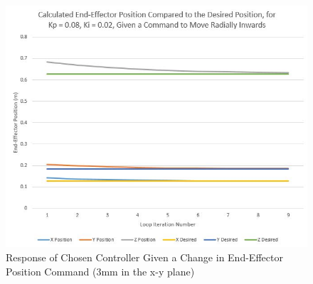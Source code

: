 \documentclass[12pt,openany,a4paper]{book}
\begin{document}
\begin{center}
\begin{figure}[htb]
  \includegraphics[width=1\linewidth]{des_act_inv1_plot.jpg}
\caption{Response of Chosen Controller Given a Change in End-Effector Position Command (3mm in the x-y plane)}
\end{figure}
\end{center}

\clearpage
\end{document}
